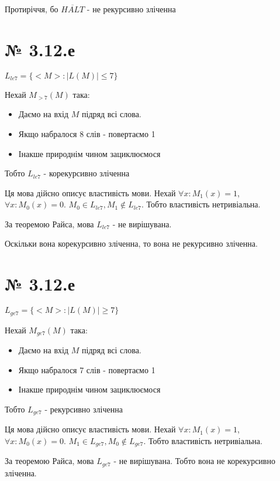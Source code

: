\documentclass[11pt, a4paper]{article} %
\begin{document}
Протиріччя, бо $\overline{HALT}$ - не рекурсивно зліченна


\section*{№ 3.12.е}
\begin{mdframed}
    $L_{le7} = \{<M> : |L(M)|\le 7\}$
\end{mdframed}

Нехай $M_{>7}(M)$ така:
\begin{itemize}
    \item Даємо на вхід $M$ підряд всі слова.
    \item Якщо набралося 8 слів - повертаємо 1
    \item Інакше природнім чином зациклюємося
\end{itemize}

Тобто  $L_{le7}$ - корекурсивно зліченна

Ця мова дійсно описує властивість мови.
Нехай $\forall x: M_{1}(x) = 1$, $\forall x: M_{0}(x) = 0$. $M_0 \in L_{le7}, M_1 \notin L_{le7}$. 
Тобто властивість нетривіальна.

За теоремою Райса, мова $L_{le7}$ - не вирішувана.

Оскільки вона корекурсивно зліченна, то вона не рекурсивно зліченна.

\section*{№ 3.12.е}
\begin{mdframed}
    $L_{ge7} = \{<M> : |L(M)|\ge 7\}$
\end{mdframed}

Нехай $M_{ge7}(M)$ така:
\begin{itemize}
    \item Даємо на вхід $M$ підряд всі слова.
    \item Якщо набралося 7 слів - повертаємо 1
    \item Інакше природнім чином зациклюємося
\end{itemize}

Тобто  $L_{ge7}$ - рекурсивно зліченна

Ця мова дійсно описує властивість мови.
Нехай $\forall x: M_{1}(x) = 1$, $\forall x: M_{0}(x) = 0$. $M_1 \in L_{ge7}, M_0 \notin L_{ge7}$. 
Тобто властивість нетривіальна.

За теоремою Райса, мова $L_{ge7}$ - не вирішувана. Тобто вона не корекурсивно зліченна.
\end{document}
